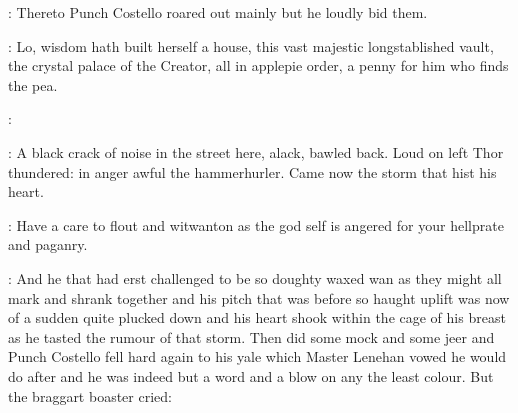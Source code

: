\documentclass[12pt]{article}
\begin{document}


: Thereto Punch Costello roared out mainly 
but he loudly bid them.

\SD: Lo, wisdom hath built herself a house, this vast majestic
longstablished vault, the crystal palace of the Creator, all in applepie
order, a penny for him who finds the pea.

\SD: 



: A black crack of noise in the street here, alack, bawled back.
Loud on left Thor thundered: in anger awful the hammerhurler.
Came now the storm that hist his heart.

\Ly: Have a care to flout and witwanton as the god self is angered for
your hellprate and paganry.

: And he that had erst challenged to be so doughty waxed wan as they
might all mark and shrank together and his pitch that was before so haught
uplift was now of a sudden quite plucked down and his heart shook within
the cage of his breast as he tasted the rumour of that storm. Then did
some mock and some jeer and Punch Costello fell hard again to his yale
which Master Lenehan vowed he would do after and he was indeed but a word
and a blow on any the least colour. But the braggart boaster cried:
\end{document}
